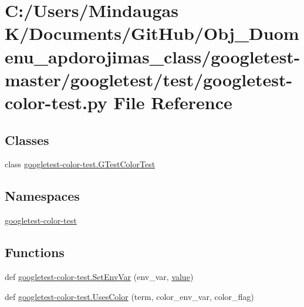 \hypertarget{googletest-master_2googletest_2test_2googletest-color-test_8py}{}\section{C\+:/\+Users/\+Mindaugas K/\+Documents/\+Git\+Hub/\+Obj\+\_\+\+Duomenu\+\_\+apdorojimas\+\_\+class/googletest-\/master/googletest/test/googletest-\/color-\/test.py File Reference}
\label{googletest-master_2googletest_2test_2googletest-color-test_8py}
\subsection*{Classes}
\begin{DoxyCompactItemize}
\item 
class \mbox{\hyperlink{classgoogletest-color-test_1_1_g_test_color_test}{googletest-\/color-\/test.\+G\+Test\+Color\+Test}}
\end{DoxyCompactItemize}
\subsection*{Namespaces}
\begin{DoxyCompactItemize}
\item 
 \mbox{\hyperlink{namespacegoogletest-color-test}{googletest-\/color-\/test}}
\end{DoxyCompactItemize}
\subsection*{Functions}
\begin{DoxyCompactItemize}
\item 
def \mbox{\hyperlink{namespacegoogletest-color-test_a6892a0e83ce77517fa25534cc2c56210}{googletest-\/color-\/test.\+Set\+Env\+Var}} (env\+\_\+var, \mbox{\hyperlink{_obj__test_2lib_2googletest-master_2googlemock_2test_2gmock-matchers__test_8cc_a337b8a670efc0b086ad3af163f3121b6}{value}})
\item 
def \mbox{\hyperlink{namespacegoogletest-color-test_a6b0f6528a3b277806378d1b0a7aa09bd}{googletest-\/color-\/test.\+Uses\+Color}} (term, color\+\_\+env\+\_\+var, color\+\_\+flag)
\end{DoxyCompactItemize}
